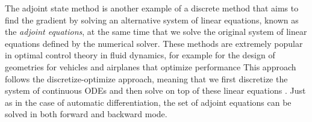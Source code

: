 The adjoint state method is another example of a discrete method that aims to find the gradient by solving an alternative system of linear equations, known as the \textit{adjoint equations}, at the same time that we solve the original system of linear equations defined by the numerical solver. 
These methods are extremely popular in optimal control theory in fluid dynamics, for example for the design of geometries for vehicles and airplanes that optimize performance \cite{Elliott_Peraire_1996, Giles_Pierce_2000}
This approach follows the discretize-optimize approach, meaning that we first discretize the system of continuous ODEs and then solve on top of these linear equations \cite{Giles_Pierce_2000}. 
Just as in the case of automatic differentiation, the set of adjoint equations can be solved in both forward and backward mode. 

